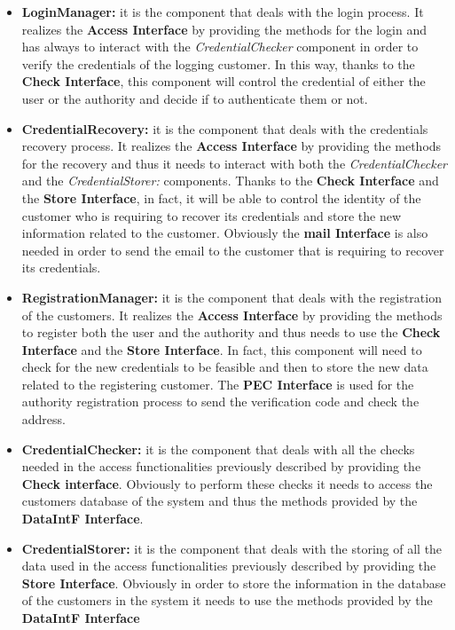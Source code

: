 			\begin{itemize}
				\item \textbf{LoginManager:} it is the component that deals with the login process. It realizes the \textbf{Access Interface} by providing the methods for the login and has always to interact with the \emph{CredentialChecker} component in order to verify the credentials of the logging customer. In this way, thanks to the \textbf{Check Interface}, this component will control the credential of either the user or the authority and decide if to authenticate them or not.
				
				\item \textbf{CredentialRecovery:} it is the component that deals with the credentials recovery process. It realizes the \textbf{Access Interface} by providing the methods for the recovery and thus it needs to interact with both the \emph{CredentialChecker} and the \emph{CredentialStorer:} components. Thanks to the \textbf{Check Interface} and the \textbf{Store Interface}, in fact, it will be able to control the identity of the customer who is requiring to recover its credentials and store the new information related to the customer. Obviously the \textbf{mail Interface} is also needed in order to send the email to the customer that is requiring to recover its credentials.
				
				\item \textbf{RegistrationManager:} it is the component that deals with the registration of the customers. It realizes the \textbf{Access Interface} by providing the methods to register both the user and the authority and thus needs to use the \textbf{Check Interface} and the \textbf{Store Interface}. In fact, this component will need to check for the new credentials to be feasible and then to store the new data related to the registering customer. The \textbf{PEC Interface} is used for the authority registration process to send the verification code and check the address.
				
				\item \textbf{CredentialChecker:} it is the component that deals with all the checks needed in the access functionalities previously described by providing the \textbf{Check interface}. Obviously to perform these checks it needs to access the customers database of the system and thus the methods provided by the \textbf{DataIntF Interface}.
				
				\item \textbf{CredentialStorer:} it is the component that deals with the storing of all the data used in the access functionalities previously described by providing the \textbf{Store Interface}.
				Obviously in order to store the information in the database of the customers in the system it needs to use the methods provided by the \textbf{DataIntF Interface}
			\end{itemize}
		
